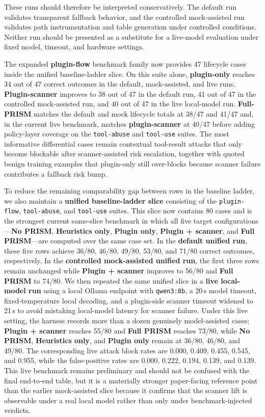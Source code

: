 These runs should therefore be interpreted conservatively. The default run validates transparent fallback behavior, and the controlled mock-assisted run validates path instrumentation and table generation under controlled conditions. Neither run should be presented as a substitute for a live-model evaluation under fixed model, timeout, and hardware settings.

The expanded \textbf{plugin-flow} benchmark family now provides 47 lifecycle cases inside the unified baseline-ladder slice. On this suite alone, \textbf{plugin-only} reaches 34 out of 47 correct outcomes in the default, mock-assisted, and live runs. \textbf{Plugin-scanner} improves to 38 out of 47 in the default run, 41 out of 47 in the controlled mock-assisted run, and 40 out of 47 in the live local-model run. \textbf{Full-PRISM} matches the default and mock lifecycle totals at 38/47 and 41/47 and, in the current live benchmark, matches \textbf{plugin-scanner} at 40/47 before adding policy-layer coverage on the \texttt{tool-abuse} and \texttt{tool-use} suites. The most informative differential cases remain contextual tool-result attacks that only become blockable after scanner-assisted risk escalation, together with quoted benign training examples that plugin-only still over-blocks because scanner failure contributes a fallback risk bump.

To reduce the remaining comparability gap between rows in the baseline ladder, we also maintain a \textbf{unified baseline-ladder slice} consisting of the \texttt{plugin-flow}, \texttt{tool-abuse}, and \texttt{tool-use} suites. This slice now contains 80 cases and is the strongest current same-slice benchmark in which all five target configurations---\textbf{No PRISM}, \textbf{Heuristics only}, \textbf{Plugin only}, \textbf{Plugin + scanner}, and \textbf{Full PRISM}---are computed over the same case set. In the \textbf{default unified run}, these five rows achieve 36/80, 46/80, 49/80, 53/80, and 71/80 correct outcomes, respectively. In the \textbf{controlled mock-assisted unified run}, the first three rows remain unchanged while \textbf{Plugin + scanner} improves to 56/80 and \textbf{Full PRISM} to 74/80. We then repeated the same unified slice in a \textbf{live local-model run} using a local Ollama endpoint with \texttt{qwen3:8b}, a 20\,s model timeout, fixed-temperature local decoding, and a plugin-side scanner timeout widened to 21\,s to avoid mistaking local-model latency for scanner failure. Under this live setting, the harness records more than a dozen genuinely model-assisted cases; \textbf{Plugin + scanner} reaches 55/80 and \textbf{Full PRISM} reaches 73/80, while \textbf{No PRISM}, \textbf{Heuristics only}, and \textbf{Plugin only} remain at 36/80, 46/80, and 49/80. The corresponding live attack block rates are 0.000, 0.409, 0.455, 0.545, and 0.955, while the false-positive rates are 0.000, 0.222, 0.194, 0.139, and 0.139. This live benchmark remains preliminary and should not be confused with the final end-to-end table, but it is a materially stronger paper-facing reference point than the earlier mock-assisted slice because it confirms that the scanner lift is observable under a real local model rather than only under benchmark-injected verdicts.

